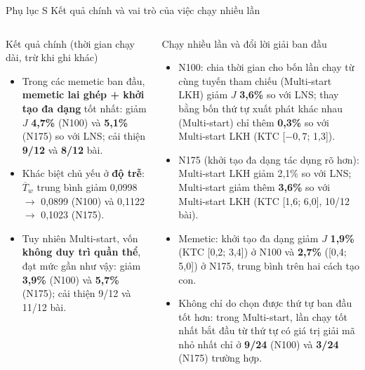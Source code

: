 \documentclass[aspectratio=169,10pt,t,xcolor={table}]{beamer}
\newcommand{\meanT}{\overline{T}_{\!w}}
\newcommand{\mth}[1]{\textsf{#1}}
\newcommand{\msd}{\mth{Multi-start}}
\newcommand{\msl}{\mth{Multi-start LKH}}
\newcommand{\lns}{\mth{LNS}}
\newcommand{\apptitle}[2]{Phụ lục #1 \textperiodcentered{} #2}
\begin{document}
\begin{frame}{\apptitle{S}{Kết quả chính và vai trò của việc chạy nhiều lần}}
\begin{columns}[T,onlytextwidth]
\begin{block}{Kết quả chính (thời gian chạy dài, trừ khi ghi khác)}
\scriptsize
\begin{itemize}
\item Trong các memetic ban đầu, \textbf{memetic lai ghép + khởi tạo đa dạng} tốt nhất: giảm $J$ \textbf{4,7\%} (N100) và \textbf{5,1\%} (N175) so với \lns{}; cải thiện \textbf{9/12} và \textbf{8/12} bài.
\item Khác biệt chủ yếu ở \textbf{độ trễ}: $\meanT$ trung bình giảm 0,0998 $\to$ 0,0899 (N100) và 0,1122 $\to$ 0,1023 (N175).
\item Tuy nhiên \msd{}, vốn \textbf{không duy trì quần thể}, đạt mức gần như vậy: giảm \textbf{3,9\%} (N100) và \textbf{5,7\%} (N175); cải thiện 9/12 và 11/12 bài.
\end{itemize}
\end{block}
\begin{block}{Chạy nhiều lần và đổi lời giải ban đầu}
\scriptsize
\begin{itemize}
\item N100: chia thời gian cho bốn lần chạy từ cùng tuyến tham chiếu (\msl{}) giảm $J$ \textbf{3,6\%} so với \lns{}; thay bằng bốn thứ tự xuất phát khác nhau (\msd{}) chỉ thêm \textbf{0,3\%} so với \msl{} (KTC [$-0{,}7$; 1,3]).
\item N175 (khởi tạo đa dạng tác dụng rõ hơn): \msl{} giảm 2,1\% so với \lns{}; \msd{} giảm thêm \textbf{3,6\%} so với \msl{} (KTC [1,6; 6,0], 10/12 bài).
\item Memetic: khởi tạo đa dạng giảm $J$ \textbf{1,9\%} (KTC [0,2; 3,4]) ở N100 và \textbf{2,7\%} ([0,4; 5,0]) ở N175, trung bình trên hai cách tạo con.
\item Không chỉ do chọn được thứ tự ban đầu tốt hơn: trong \msd{}, lần chạy tốt nhất bắt đầu từ thứ tự có giá trị giải mã nhỏ nhất chỉ ở \textbf{9/24} (N100) và \textbf{3/24} (N175) trường hợp.
\end{itemize}
\end{block}
\end{columns}
\end{frame}
\end{document}
